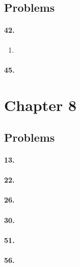     \subsection*{Problems}

    \paragraph*{42.}\mbox{}

    \begin{enumerate}[label=\alph*]
        \item 
    \end{enumerate}

    \paragraph*{45.}\mbox{}

    \section*{Chapter 8}

    \subsection*{Problems}

    \paragraph*{13.}\mbox{}

    \paragraph*{22.}\mbox{}

    \paragraph*{26.}\mbox{}

    \paragraph*{30.}\mbox{}

    \paragraph*{51.}\mbox{}

    \paragraph*{56.}\mbox{}
    
